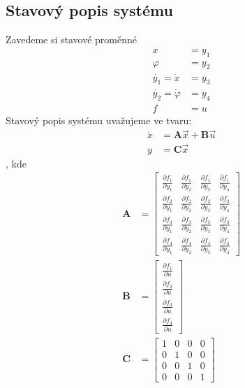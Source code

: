 \documentclass[a4paper, 12pt]{article}
\begin{document}
		\subsection{Stavový popis systému}
			Zavedeme si stavové proměnné
			\begin{align*}
				x &= y_1\\
				\varphi &= y_2\\
				\dot{y_1} = \dot{x} &= y_3\\
				\dot{y_2} = \dot{\varphi} &= y_4\\
				f &= u
			\end{align*}
			Stavový popis systému uvažujeme ve tvaru:
			\begin{align*}
				\dot{x} &= \mathbf{A}\vec{x}+\mathbf{B}\vec{u}\\
				y &= \mathbf{C}\vec{x}   %
			\end{align*}
			, kde 
			\begin{align*}
				\mathbf{A} &= \left[\begin{matrix}
					\frac{\partial f_1}{\partial y_1} & \frac{\partial f_1}{\partial y_2} & \frac{\partial f_1}{\partial y_3} & \frac{\partial f_1}{\partial y_4}\\
					\frac{\partial f_2}{\partial y_1} & \frac{\partial f_2}{\partial y_2} & \frac{\partial f_2}{\partial y_3} & \frac{\partial f_2}{\partial y_4}\\
					\frac{\partial f_3}{\partial y_1} & \frac{\partial f_3}{\partial y_2} & \frac{\partial f_3}{\partial y_3} & \frac{\partial f_3}{\partial y_4}\\
					\frac{\partial f_4}{\partial y_1} & \frac{\partial f_4}{\partial y_2} & \frac{\partial f_4}{\partial y_3} & \frac{\partial f_4}{\partial y_4}	
				\end{matrix}\right]\\
				\mathbf{B} &= \left[\begin{matrix}
					\frac{\partial f_1}{\partial u}\\
					\frac{\partial f_2}{\partial u}\\
					\frac{\partial f_3}{\partial u}\\
					\frac{\partial f_4}{\partial u}
				\end{matrix}\right]\\
				\mathbf{C} &= \left[\begin{matrix}
					1 & 0 & 0 & 0\\
					0 & 1 & 0 & 0\\
					0 & 0 & 1 & 0\\
					0 & 0 & 0 & 1
				\end{matrix}\right]
			\end{align*}
\end{document}
